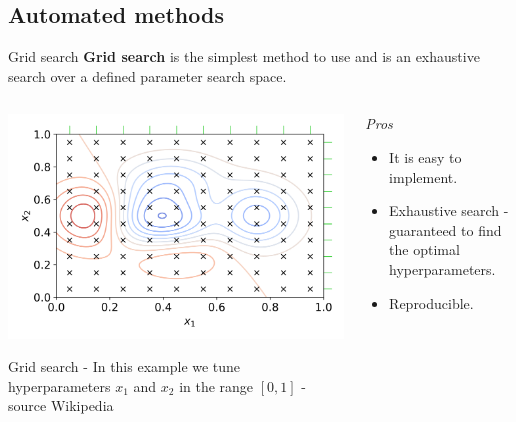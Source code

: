\documentclass[9pt, aspectratio=169]{beamer}
\begin{document}
\subsection{Automated methods}

\begin{frame}
    {Grid search}
    \textbf{Grid search} is the simplest method to use and is an exhaustive search over a defined parameter search space.

    \begin{columns}
        \begin{column}{.5\textwidth}
            \centering
            \includegraphics[width=\textwidth]{gridsearch.png}

            \footnotesize
            Grid search - In this example we tune hyperparameters $x_1$ and $x_2$ in the range $[0,1]$ - source Wikipedia
        \end{column}
        \begin{column}{.5\textwidth}
            {
                \textit{Pros}
                \begin{itemize}
                    \item It is easy to implement.
                    \item Exhaustive search - guaranteed to find the optimal hyperparameters.
                    \item Reproducible.
                \end{itemize}
            }
        \end{column}
    \end{columns}
\end{frame}
\end{document}
